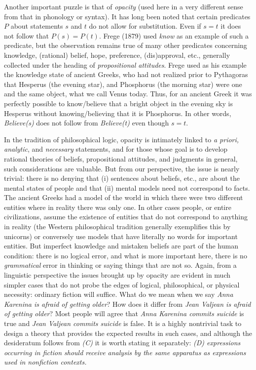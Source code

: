Another important puzzle is that of {\it opacity} (used here in a very
different sense from that in phonology or syntax).  It has long been noted that certain predicates $P$ about
statements $s$ and $t$ do not allow for substitution. Even if $s=t$ it does
not follow that $P(s)=P(t)$.  Frege (1879) used {\it know} as an example of
such a predicate, but the observation remains true of many other predicates
concerning knowledge, (rational) belief, hope, preference, (dis)approval,
etc., generally collected under the heading of {\it propositional attitudes}.
 Frege used as his example the knowledge state
of ancient Greeks, who had not realized prior to Pythagoras that Hesperus
(the evening star), and Phosphorus (the morning star) were one and the same
object, what we call Venus today. Thus, for an ancient Greek it was perfectly
possible to know/believe that a bright object in the evening sky is Hesperus
without knowing/believing that it is Phosphorus. In other words, {\it
  Believe(s)} does not follow from {\it Believe(t)} even though $s=t$.

In the tradition of philosophical logic, opacity is intimately linked to {\it
a priori, analytic}, and {\it necessary} statements, and for those whose goal
is to develop rational theories of beliefs, propositional attitudes, and
judgments in general, such considerations are valuable. But from our
perspective, the issue is nearly trivial: there is no denying that (i)
sentences about beliefs, etc., are about the mental states of people and that
(ii) mental models need not correspond to facts. The ancient Greeks had a
model of the world in which there were two different entities where in reality
there was only one. In other cases people, or entire civilizations, assume the
existence of entities that do not correspond to anything in reality (the
Western philosophical tradition generally exemplifies this by unicorns) or
conversely use models that have literally no words for important entities.
But imperfect knowledge and mistaken beliefs are part of the human condition:
there is no logical error, and what is more important here, there is no {\it
grammatical} error in thinking or saying things that are not so. Again, from a
linguistic perspective the issues brought up by opacity are evident in much
simpler cases that do not probe the edges of logical, philosophical, or
physical necessity: ordinary fiction will suffice. What do we mean when we say
{\it Anna Karenina is afraid of getting older}? How does it differ from {\it
Jean Valjean is afraid of getting older}? Most people will agree that {\it
Anna Karenina commits suicide} is true and {\it Jean Valjean commits suicide}
is false. It is a highly nontrivial task to design a theory that provides the
expected results in such cases, and although the desideratum follows from {\sl
(C)} it is worth stating it separately: {\sl (D) expressions occurring in
fiction should receive analysis by the same apparatus as expressions used in
nonfiction contexts.}

